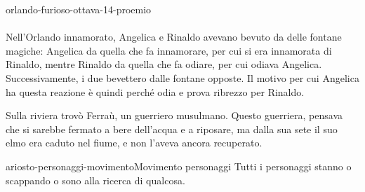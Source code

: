 \documentclass[preview]{standalone}
\begin{document}
\begin{snippet}{orlando-furioso-ottava-14-proemio}
    \\\\
    Nell'Orlando innamorato, Angelica e Rinaldo avevano bevuto da delle fontane magiche:
    Angelica da quella che fa innamorare, per cui si era innamorata di Rinaldo,
    mentre Rinaldo da quella che fa odiare, per cui odiava Angelica.
    Successivamente, i due bevettero dalle fontane opposte. Il motivo per cui
    Angelica ha questa reazione è quindi perché odia e prova ribrezzo
    per Rinaldo.

    Sulla riviera trovò Ferraù, un guerriero musulmano.
    Questo guerriera, pensava che si sarebbe fermato a bere dell'acqua e a riposare,
    ma dalla sua sete il suo elmo era caduto nel fiume, e non l'aveva ancora
    recuperato.
\end{snippet}

\begin{snippetnote}{ariosto-personaggi-movimento}{Movimento personaggi}
    Tutti i personaggi stanno o scappando o sono alla ricerca di qualcosa.
\end{snippetnote}
\end{document}

